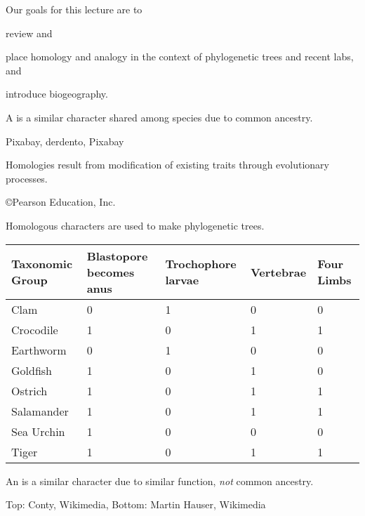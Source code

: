 \documentclass[t]{beamer}
\begin{document}
\begin{frame}{Our goals for this lecture are to }
	
	\hangpara review  and 
	
	\hangpara place homology and analogy in the context of phylogenetic trees and recent labs, and

	\hangpara introduce biogeography.
	
\end{frame}

%

%
%
{
\begin{frame}[b]{A  is a similar character shared among species due to common ancestry.}

	\vfilll

	\tiny Pixabay, \cc \hfill derdento, Pixabay \cc

\end{frame}
}
%
{
\begin{frame}[t]{Homologies result from modification of existing traits through evolutionary processes.}

	\vfilll

	\hfill \tiny \copyright Pearson Education, Inc.

\end{frame}
}
%
\begin{frame}[t]{Homologous characters are used to make phylogenetic trees.}

\begin{longtable}[l]{@{}L{0.8in}C{0.9in}C{0.9in}C{0.7in}C{0.7in}@{}}
\toprule
Taxonomic Group & Blastopore becomes anus & Trochophore larvae & Vertebrae & Four Limbs \tabularnewline
\midrule
Clam &
	0 &
	1 & 
	0 & 
	0 \tabularnewline
Crocodile &
	1 & 
	0 & 
	1 & 
	1 \tabularnewline
Earthworm & 
	0 &
	1 & 
	0 & 
	0 \tabularnewline
Goldfish & 
	1 & 
	0 & 
	1 & 
	0 \tabularnewline
Ostrich & 
	1 & 
	0 & 
	1 & 
	1 \tabularnewline
Salamander & 
	1 & 
	0 & 
	1 & 
	1 \tabularnewline
Sea Urchin &
	1 &
	0 & 
	0 & 
	0 \tabularnewline
Tiger & 
	1 & 
	0 & 
	1 & 
	1 \tabularnewline
\bottomrule
\end{longtable}

\end{frame}
%
{
\begin{frame}[b]{An  is a similar character due to similar function, \emph{not} common ancestry.}


\tiny Top: Conty, Wikimedia,  \hfill Bottom: Martin Hauser, Wikimedia 
\end{frame}
}
\end{document}
